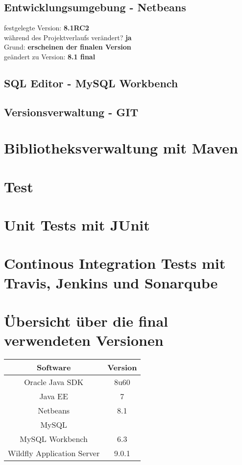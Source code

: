 \documentclass[12pt,a4paper,parskip]{scrreprt}
\begin{document}
\subsection{Entwicklungsumgebung - Netbeans}
festgelegte Version: \textbf{8.1RC2}\\
während des Projektverlaufs verändert? \textbf{ja}\\
Grund: \textbf{erscheinen der finalen Version} \\
geändert zu Version: \textbf{8.1 final}\\

\subsection{SQL Editor - MySQL Workbench}
\subsection{Versionsverwaltung - GIT}
\section{Bibliotheksverwaltung mit Maven}
\section{Test}
\section{Unit Tests mit JUnit}
\section{Continous Integration Tests mit Travis, Jenkins und Sonarqube}
\section{Übersicht über die final verwendeten Versionen}
\begin{center}
\begin{tabular}{|c|c|}
\hline
\rule[-1ex]{0pt}{2.5ex} Software & Version  \\ 
\hline 
\rule[-1ex]{0pt}{2.5ex} Oracle Java SDK & 8u60  \\ 
\hline 
\rule[-1ex]{0pt}{2.5ex} Java EE & 7 \\ 
\hline 
\rule[-1ex]{0pt}{2.5ex} Netbeans & 8.1 \\ 
\hline 
\rule[-1ex]{0pt}{2.5ex} MySQL &  \\ 
\hline 
\rule[-1ex]{0pt}{2.5ex} MySQL Workbench & 6.3 \\ 
\hline
\rule[-1ex]{0pt}{2.5ex} Wildfly Application Server & 9.0.1 \\ 
\hline 
\end{tabular}
\end{center}
\end{document}
